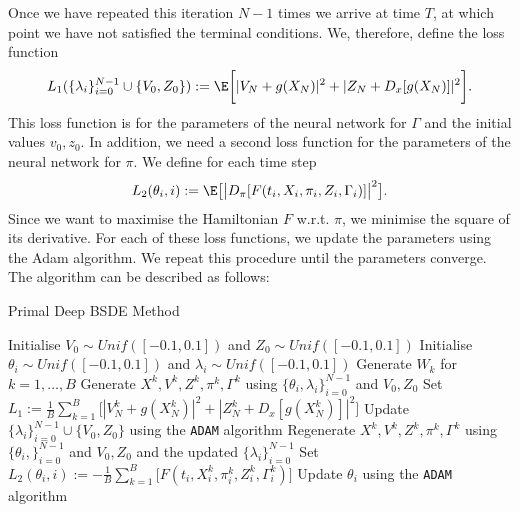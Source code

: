Once we have repeated this iteration $N-1$ times we arrive at time $T$, at which point we have not satisfied the terminal conditions. We, therefore, define the loss function
\begin{equation*}
    L_1(\{ \lambda_i\}_{i=0}^{N-1} \cup \{ V_0, Z_0 \}) := \E \bigg[ |V_N + g(X_N)|^2 + | Z_N + D_x[g(X_N)]|^2 \bigg].
\end{equation*}
This loss function is for the parameters of the neural network for $\Gamma$ and the initial values $v_0, z_0$. In addition, we need a second loss function for the parameters of the neural network for $\pi$. We define for each time step 
\begin{equation*}
    L_2(\theta_i, i) := \E \big[\big|D_{\pi}[F(t_i, X_i, \pi_i, Z_i, \Gamma_i)]\big|^2 \big].
\end{equation*}
Since we want to maximise the Hamiltonian $F$ w.r.t. $\pi$, we minimise the square of its derivative. For each of these loss functions, we update the parameters using the Adam algorithm. We repeat this procedure until the parameters converge. The algorithm can be described as follows: \\

\begin{algorithm}
    \caption{Primal Deep BSDE Method}
    \begin{algorithmic}
        \State Initialise $V_0 \sim Unif([-0.1, 0.1])$ and $Z_0 \sim Unif([-0.1, 0.1])$ 
            \State Initialise $\theta_i \sim Unif([-0.1, 0.1])$ and $\lambda_i \sim Unif([-0.1, 0.1])$
        \EndFor
            \State Generate $W_k$ for $k=1,\dots, B$
            \State Generate $X^k, V^k, Z^k, \pi^k, \Gamma^k$ using $\{ \theta_i, \lambda_i\}_{i=0}^{N-1}$ and $V_0, Z_0$
            \State Set $L_1 := \frac{1}{B}\sum_{k=1}^{B} \bigg[ |V^k_N + g(X^k_N)|^2 + | Z_N^k + D_x[g(X_N^k)]|^2 \bigg]$
            \State Update $\{ \lambda_i\}_{i=0}^{N-1} \cup \{ V_0, Z_0 \}$ using the \verb|ADAM| algorithm
            \State Regenerate $X^k, V^k, Z^k, \pi^k, \Gamma^k$ using $\{ \theta_i, \}_{i=0}^{N-1}$ and $V_0, Z_0$ and the updated $\{ \lambda_i\}_{i=0}^{N-1}$
                \State Set $L_2(\theta_i, i) := -\frac{1}{B}\sum_{k=1}^{B} \big[  F(t_i, X^k_i, \pi^k_i, Z^k_i, \Gamma^k_i) \big]$
                \State Update $\theta_i $ using the \verb|ADAM| algorithm
            \EndFor
        \EndFor
    \end{algorithmic}
\end{algorithm}










